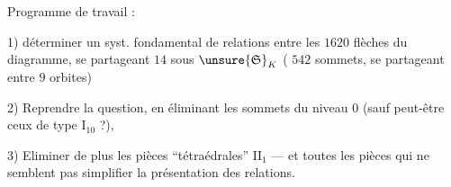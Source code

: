 Programme de travail :

1) déterminer un syst. fondamental de relations entre les \(1620\) flèches du diagramme, se partageant  \(14\)   sous \(\unsure{\mathfrak S}_K\) ( \(542\) sommets, se partageant entre \(9\) orbites)



2) Reprendre la question, en éliminant les sommets du niveau \(0\) (sauf peut-être ceux de type \(\mathrm I_{10}\) ?),

3) Eliminer de plus les pièces  ``tétraédrales'' \(\mathrm{II}_1\) --- et toutes les pièces qui ne semblent pas simplifier la présentation des relations.

